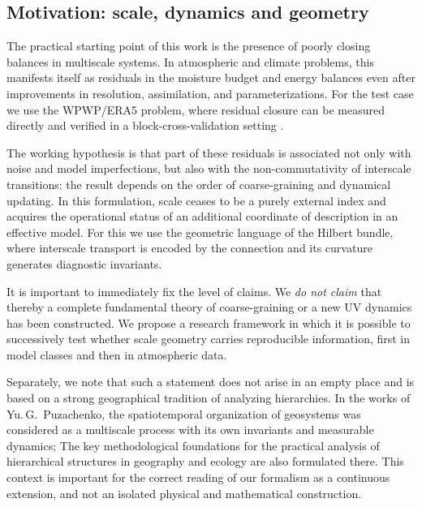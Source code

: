 \documentclass[11pt,a4paper]{article}
\theoremstyle{definition}
\theoremstyle{plain}
\theoremstyle{remark}
\begin{document}
\subsection{Motivation: scale, dynamics and geometry}

The practical starting point of this work is the presence of poorly closing balances in multiscale systems. In atmospheric and climate problems, this manifests itself as residuals in the moisture budget and energy balances even after improvements in resolution, assimilation, and parameterizations. For the test case we use the WPWP/ERA5 problem, where residual closure can be measured directly and verified in a block-cross-validation setting \cite{Hersbach2020ERA5,CopernicusC3S2017ERA5,PeixotoOort1992PhysicsClimate,TrenberthEtAl2007WaterBudget}.

The working hypothesis is that part of these residuals is associated not only with noise and model imperfections, but also with the non-commutativity of interscale transitions: the result depends on the order of coarse-graining and dynamical updating. In this formulation, scale ceases to be a purely external index and acquires the operational status of an additional coordinate of description in an effective model. For this we use the geometric language of the Hilbert bundle, where interscale transport is encoded by the connection and its curvature generates diagnostic invariants.

It is important to immediately fix the level of claims. We \emph{do not claim} that thereby a complete fundamental theory of coarse-graining or a new UV dynamics has been constructed. We propose a research framework in which it is possible to successively test whether scale geometry carries reproducible information, first in model classes and then in atmospheric data.

Separately, we note that such a statement does not arise in an empty place and is based on a strong geographical tradition of analyzing hierarchies. In the works of Yu.\,G.~Puzachenko, the spatiotemporal organization of geosystems was considered as a multiscale process with its own invariants and measurable dynamics; The key methodological foundations for the practical analysis of hierarchical structures in geography and ecology \cite{Puzachenko1986Hierarchy,Puzachenko2004Methods,Puzachenko2010Invariants} are also formulated there. This context is important for the correct reading of our formalism as a continuous extension, and not an isolated physical and mathematical construction.
\end{document}
